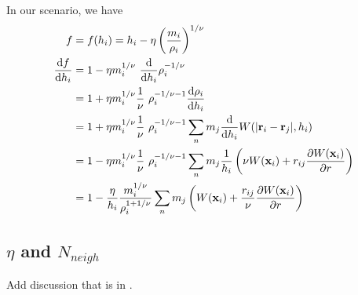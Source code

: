 In our scenario, we have
\begin{align}
	f 
		&= f(h_i) = h_i - \eta \left(\frac{m_i}{\rho_i}\right) ^ {1/\nu}\\
	\frac{\de f}{\de h_i} 
		&= 1 - \eta m_i ^ {1/\nu} \ \frac{\de }{\de h_i} \rho_i ^ {-1/\nu} 
			\nonumber \\
		&= 1 + \eta m_i ^ {1/\nu}  \frac{1}{\nu} \ \rho_i ^ {-1/\nu - 1} \frac{\de \rho_i}{\de h_i} 
			\nonumber \\
		&= 1 + \eta m_i ^ {1/\nu}  \frac{1}{\nu} \ \rho_i ^ {-1/\nu - 1} \sum_{n} m_j \frac{\de}{\de h_i} W(|\R_i - \R_j|, h_i) 
			\nonumber \\
		&= 1 - \eta m_i ^ {1/\nu}  \frac{1}{\nu} \ \rho_i ^ {-1/\nu - 1} \sum_{n} m_j \frac{1}{h_i} \left( \nu W(\x_i) + r_{ij}  \DELDR{W(\x_i)} \right)
			\nonumber \\
		&= 1 - \frac{\eta}{h_i}  \frac{m_i ^ {1/\nu}}{\rho_i^{1 + 1/\nu}}  \sum_{n} m_j \left( W(\x_i) + \frac{r_{ij}}{\nu}   \DELDR{W(\x_i)} \right)
\end{align}











\subsection{$\eta$ and $N_{neigh}$}

Add discussion that is in \cite{priceSmoothedParticleHydrodynamics2012a}.